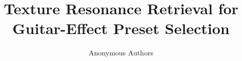 \documentclass[journal,10pt]{IEEEtran}
\title{Texture Resonance Retrieval for Guitar-Effect Preset Selection}
\author{Anonymous Authors}
\begin{document}
\newcommand{\paperbibliostyle}{IEEEtranN}

\end{document}
